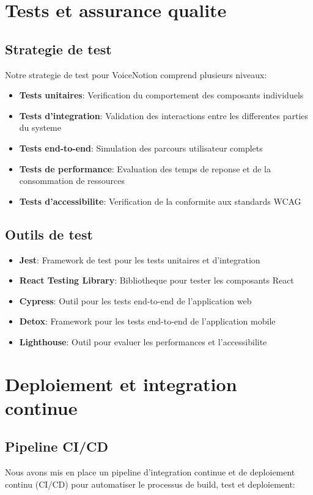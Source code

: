 \section{Tests et assurance qualite}
\subsection{Strategie de test}
Notre strategie de test pour VoiceNotion comprend plusieurs niveaux:
\begin{itemize}
    \item \textbf{Tests unitaires}: Verification du comportement des composants individuels
    \item \textbf{Tests d'integration}: Validation des interactions entre les differentes parties du systeme
    \item \textbf{Tests end-to-end}: Simulation des parcours utilisateur complets
    \item \textbf{Tests de performance}: Evaluation des temps de reponse et de la consommation de ressources
    \item \textbf{Tests d'accessibilite}: Verification de la conformite aux standards WCAG
\end{itemize}

\subsection{Outils de test}
\begin{itemize}
    \item \textbf{Jest}: Framework de test pour les tests unitaires et d'integration
    \item \textbf{React Testing Library}: Bibliotheque pour tester les composants React
    \item \textbf{Cypress}: Outil pour les tests end-to-end de l'application web
    \item \textbf{Detox}: Framework pour les tests end-to-end de l'application mobile
    \item \textbf{Lighthouse}: Outil pour evaluer les performances et l'accessibilite
\end{itemize}

\section{Deploiement et integration continue}
\subsection{Pipeline CI/CD}
Nous avons mis en place un pipeline d'integration continue et de deploiement continu (CI/CD) pour automatiser le processus de build, test et deploiement:

